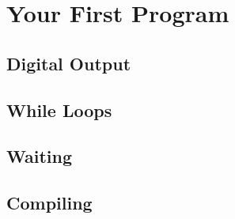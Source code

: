 \section{Your First Program}
\label{sec:first_program}

\subsection{Digital Output}
\label{sub:digital_output}


\subsection{While Loops}
\label{sub:while_loops}


\subsection{Waiting}
\label{sub:waiting}


\subsection{Compiling}
\label{sub:compiling}
